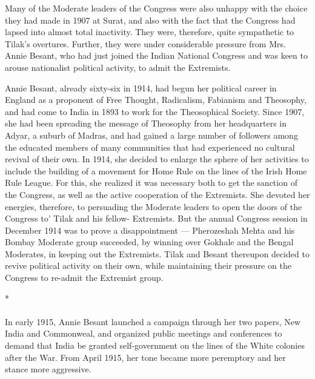 Many of the Moderate leaders of the Congress were also unhappy with the choice they had made in 1907 at Surat, and also with the fact that the Congress had lapsed into almost total inactivity. They were, therefore, quite sympathetic to Tilak's overtures. Further, they were under considerable pressure from Mrs. Annie Besant, who had just joined the Indian National Congress and was keen to arouse nationalist political activity, to admit the Extremists.

Annie Besant, already sixty-six in 1914, had begun her political career in England as a proponent of Free Thought, Radicalism, Fabianism and Theosophy, and had come to India in 1893 to work for the Theosophical Society. Since 1907, she had been spreading the message of Theosophy from her headquarters in Adyar, a suburb of Madras, and had gained a large number of followers among the educated members of many communities that had experienced no cultural revival of their own. In 1914, she decided to enlarge the sphere of her activities to include the building of a movement for Home Rule on the lines of the Irish Home Rule League. For this, she realized it was necessary both to get the sanction of the Congress, as well as the active cooperation of the Extremists. She devoted her energies, therefore, to persuading the Moderate leaders to open the doors of the Congress to' Tilak and his fellow- Extremists. But the annual Congress session in December 1914 was to prove a disappointment --- Pherozeshah Mehta and his Bombay Moderate group succeeded, by winning over Gokhale and the Bengal Moderates, in keeping out the Extremists. Tilak and Besant thereupon decided to revive political activity on their own, while maintaining their pressure on the Congress to re-admit the Extremist group.

\begin{center}*\end{center}

\paragraph*{}

In early 1915, Annie Besant launched a campaign through her two papers, New India and Commonweal, and organized public meetings and conferences to demand that India be granted self-government on the lines of the White colonies after the War. From April 1915, her tone became more peremptory and her stance more aggressive.

